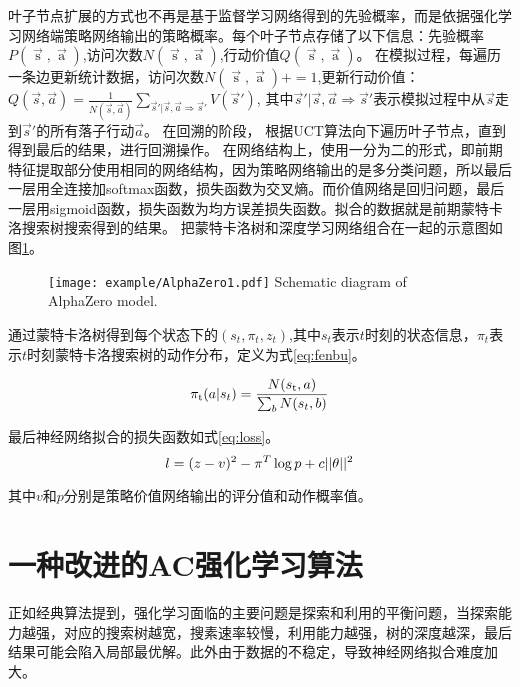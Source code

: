 叶子节点扩展的方式也不再是基于监督学习网络得到的先验概率，而是依据强化学习网络端策略网络输出的策略概率。每个叶子节点存储了以下信息：先验概率$P(\mathop s\limits^ \to  ,\mathop a\limits^ \to  )$,访问次数$N(\mathop s\limits^ \to  ,\mathop a\limits^ \to  )$,行动价值$Q(\mathop s\limits^ \to  ,\mathop a\limits^ \to  )$。
在模拟过程，每遍历一条边更新统计数据，访问次数${N(\mathop s\limits^ \to  ,\mathop a\limits^ \to  )} +=1$,更新行动价值：$Q(\vec{s},\vec{a})=\frac{1}{N(\vec{s},\vec{a})}\sum_{\vec{s}'\vert \vec{s},\vec{a}\Rightarrow \vec{s}'}V(\vec{s}')$, 其中$\vec{s}'\vert \vec{s},\vec{a} \Rightarrow \vec{s}'$表示模拟过程中从$\vec{s}$走到$\vec{s}'$的所有落子行动$\vec{a}$。
在回溯的阶段，
根据UCT算法向下遍历叶子节点，直到得到最后的结果，进行回溯操作。
在网络结构上，使用一分为二的形式，即前期特征提取部分使用相同的网络结构，因为策略网络输出的是多分类问题，所以最后一层用全连接加softmax函数，损失函数为交叉熵。而价值网络是回归问题，最后一层用sigmoid函数，损失函数为均方误差损失函数。拟合的数据就是前期蒙特卡洛搜索树搜索得到的结果。
把蒙特卡洛树和深度学习网络组合在一起的示意图如图\ref{fig:Alphazero1}。

\begin{figure}[htbp]
	\centering
	\texttt{[image: example/AlphaZero1.pdf]}
	{Schematic diagram of AlphaZero model.}
	\label{fig:Alphazero1}
\end{figure}

通过蒙特卡洛树得到每个状态下的$({s_t},{\pi _t},{z_t})$,其中$s_t$表示$t$时刻的状态信息，$\pi_t$表示$t$时刻蒙特卡洛搜索树的动作分布，定义为式\ref{eq:fenbu}。

\begin{equation}
\label{eq:fenbu}
{\pi _{\rm{t}}}(a|{s_t}) = \frac{{N({s_{\rm{t}}},a)}}{{\sum\nolimits_b {N({s_t},b)} }}
\end{equation}

最后神经网络拟合的损失函数如式\ref{eq:loss}。
\begin{equation}
\label{eq:loss}
l = {(z - v)^2} - {\pi ^T}\log p + c{\rm{||}}\theta {\rm{|}}{{\rm{|}}^2}
\end{equation}

其中$v$和$p$分别是策略价值网络输出的评分值和动作概率值。

\section{一种改进的AC强化学习算法}

正如经典算法提到，强化学习面临的主要问题是探索和利用的平衡问题，当探索能力越强，对应的搜索树越宽，搜素速率较慢，利用能力越强，树的深度越深，最后结果可能会陷入局部最优解。此外由于数据的不稳定，导致神经网络拟合难度加大。


